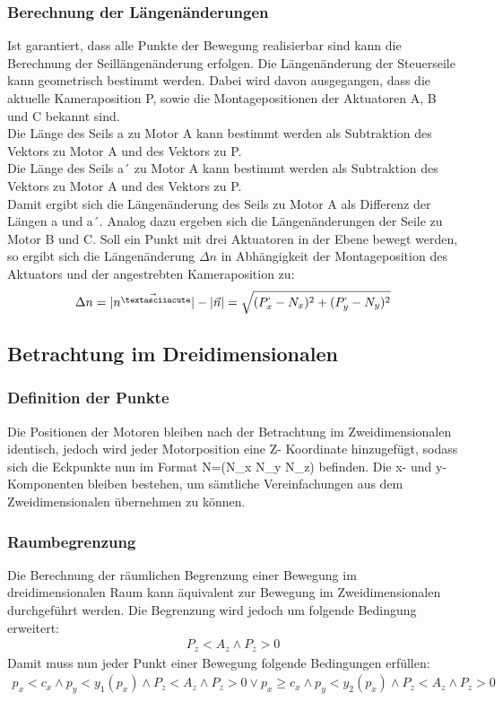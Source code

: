 \documentclass[a4paper, 12pt]{article}
\begin{document}
			\subsubsection{Berechnung der Längenänderungen}
			Ist garantiert, dass alle Punkte der Bewegung realisierbar sind kann die Berechnung der Seillängenänderung erfolgen. 
			Die Längenänderung der Steuerseile kann geometrisch bestimmt werden.
			Dabei wird davon ausgegangen, dass die aktuelle Kameraposition P, sowie die Montagepositionen der Aktuatoren A, B und C bekannt sind.\\
			Die Länge des Seils a zu Motor A kann bestimmt werden als Subtraktion des Vektors zu Motor A und des Vektors zu P.\\
			Die Länge des Seils a´ zu Motor A kann bestimmt werden als Subtraktion des Vektors zu Motor A und des Vektors zu P.\\
			Damit ergibt sich die Längenänderung des Seils zu Motor A als Differenz der Längen a und a´.
			Analog dazu ergeben sich die Längenänderungen der Seile zu Motor B und C.
			Soll ein Punkt mit drei Aktuatoren in der Ebene bewegt werden,
			so ergibt sich die Längenänderung $\Delta n$ in Abhängigkeit der Montageposition des Aktuators und der angestrebten Kameraposition zu:
			\begin{align}
				\Delta n =
				|\vec{n^{´}}|-|\vec{n}|=
				\sqrt{
				(P^{`}_{x}-N_{x})^2+
				(P^{`}_{y}-N_{y})^2
				}
			\end{align}
		\subsection{Betrachtung im Dreidimensionalen}
			\subsubsection{Definition der Punkte}
			Die Positionen der Motoren bleiben nach der Betrachtung im Zweidimensionalen identisch, jedoch wird jeder Motorposition eine Z- Koordinate hinzugefügt, sodass sich die Eckpunkte nun im Format N=(N_{x} N_{y} N_{z}) befinden. Die x- und y- Komponenten bleiben bestehen, um sämtliche Vereinfachungen aus dem Zweidimensionalen übernehmen zu können. 
			\subsubsection{Raumbegrenzung}
			Die Berechnung der räumlichen Begrenzung einer Bewegung im dreidimensionalen Raum kann äquivalent zur Bewegung im Zweidimensionalen durchgeführt werden. Die Begrenzung wird jedoch um folgende Bedingung erweitert:
			\begin{align}
				P_{z}<A_{z}\land P_{z}>0
			\end{align}
			Damit muss nun jeder Punkt einer Bewegung folgende Bedingungen erfüllen:
			\begin{align}
						p_{x}<c_{x} 
				\land 	p_{y}<y_{1}(p_{x})
				\land	P_{z}<A_{z}
				\land 	P_{z}>0 
				\lor
						p_{x} \geq c_{x} 
				\land 	p_{y}<y_{2}(p_{x})
				\land	P_{z}<A_{z}
				\land 	P_{z}>0
			\end{align}
\end{document}
